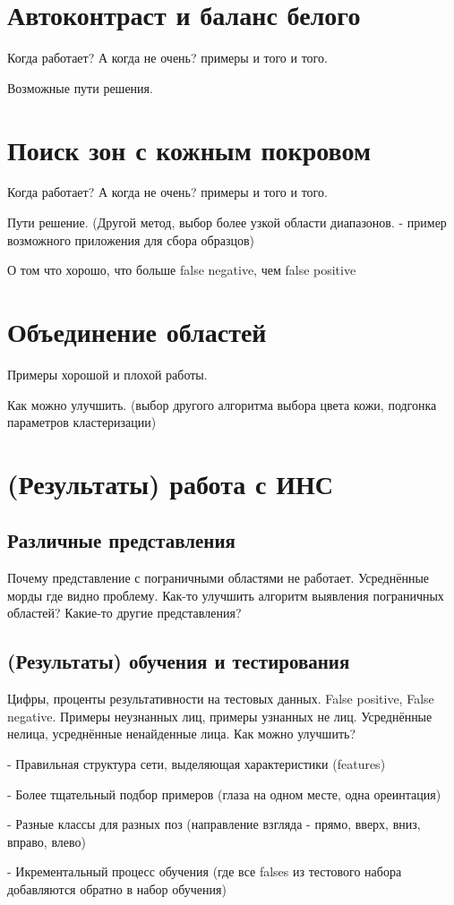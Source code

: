 \documentclass[12pt]{report}
\begin{document}
\section{Автоконтраст и баланс белого}
Когда работает? А когда не очень? примеры и того и того.

Возможные пути решения.
\section{Поиск зон с кожным покровом}
Когда работает? А когда не очень? примеры и того и того.

Пути решение. (Другой метод, выбор более узкой области диапазонов. - пример возможного приложения для сбора образцов)

О том что хорошо, что больше false negative, чем false positive
\section{Объединение областей}
Примеры хорошой и плохой работы.

Как можно улучшить. (выбор другого алгоритма выбора цвета кожи, подгонка параметров кластеризации)
\section{(Результаты) работа с ИНС}
\subsection{Различные представления}
Почему представление с пограничными областями не работает. Усреднённые морды где видно проблему. Как-то улучшить алгоритм выявления пограничных областей? Какие-то другие представления?
\subsection{(Результаты) обучения и тестирования}
Цифры, проценты результативности на тестовых данных. False positive, False negative. Примеры неузнанных лиц, примеры узнанных не лиц. Усреднённые нелица, усреднённые ненайденные лица.
Как можно улучшить?

- Правильная структура сети, выделяющая характеристики (features)

- Более тщательный подбор примеров (глаза на одном месте, одна ореинтация)

- Разные классы для разных поз (направление взгляда - прямо, вверх, вниз, вправо, влево)

- Икрементальный процесс обучения (где все falses из тестового набора добавляются обратно в набор обучения)
\end{document}
